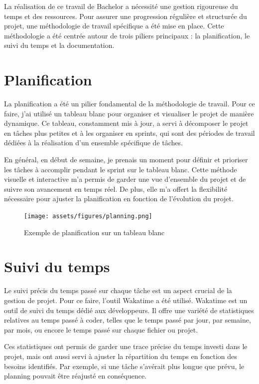 La réalisation de ce travail de Bachelor a nécessité une gestion rigoureuse du temps et des ressources. Pour assurer une progression régulière et structurée du projet, une méthodologie de travail spécifique a été mise en place. Cette méthodologie a été centrée autour de trois piliers principaux : la planification, le suivi du temps et la documentation.

\section{Planification}

La planification a été un pilier fondamental de la méthodologie de travail. Pour ce faire, j'ai utilisé un tableau blanc pour organiser et visualiser le projet de manière dynamique. Ce tableau, constamment mis à jour, a servi à décomposer le projet en tâches plus petites et à les organiser en sprints, qui sont des périodes de travail dédiées à la réalisation d'un ensemble spécifique de tâches.

En général, en début de semaine, je prenais un moment pour définir et prioriser les tâches à accomplir pendant le sprint sur le tableau blanc. Cette méthode visuelle et interactive m'a permis de garder une vue d'ensemble du projet et de suivre son avancement en temps réel. De plus, elle m'a offert la flexibilité nécessaire pour ajuster la planification en fonction de l'évolution du projet.

\begin{figure}[H]
    \centering
    \texttt{[image: assets/figures/planning.png]}
    \caption{Exemple de planification sur un tableau blanc}
\end{figure}

\section{Suivi du temps}

Le suivi précis du temps passé sur chaque tâche est un aspect crucial de la gestion de projet. Pour ce faire, l'outil Wakatime a été utilisé. Wakatime est un outil de suivi du temps dédié aux développeurs. Il offre une variété de statistiques relatives au temps passé à coder, telles que le temps passé par jour, par semaine, par mois, ou encore le temps passé sur chaque fichier ou projet.

Ces statistiques ont permis de garder une trace précise du temps investi dans le projet, mais ont aussi servi à ajuster la répartition du temps en fonction des besoins identifiés. Par exemple, si une tâche s'avérait plus longue que prévu, le planning pouvait être réajusté en conséquence.

